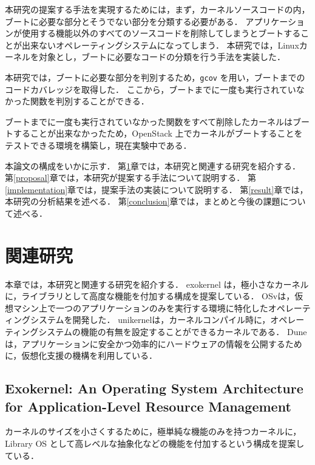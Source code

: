 \documentclass[graduation-thesis]{mlarticle}
\begin{document}
本研究の提案する手法を実現するためには，まず，カーネルソースコードの内，ブートに必要な部分とそうでない部分を分類する必要がある．
アプリケーションが使用する機能以外のすべてのソースコードを削除してしまうとブートすることが出来ないオペレーティングシステムになってしまう．
本研究では，Linuxカーネルを対象とし，ブートに必要なコードの分類を行う手法を実装した．

本研究では，ブートに必要な部分を判別するため，\texttt{gcov}\cite{gcov} を用い，ブートまでのコードカバレッジを取得した．
ここから，ブートまでに一度も実行されていなかった関数を判別することができる．

ブートまでに一度も実行されていなかった関数をすべて削除したカーネルはブートすることが出来なかったため，OpenStack\cite{openstack} 上でカーネルがブートすることをテストできる環境を構築し，現在実験中である．

本論文の構成をいかに示す．
第\ref{relative}章では，本研究と関連する研究を紹介する．
第\ref{proposal}章では，本研究が提案する手法について説明する．
第\ref{implementation}章では，提案手法の実装について説明する．
第\ref{result}章では，本研究の分析結果を述べる．
第\ref{conclusion}章では，まとめと今後の課題について述べる．

\clearpage
\section {関連研究}
\label{relative}

本章では，本研究と関連する研究を紹介する．
exokernel\cite{engler1995exokernel} は，極小さなカーネルに，ライブラリとして高度な機能を付加する構成を提案している．
OSv\cite{kivity2014osv}は，仮想マシン上で一つのアプリケーションのみを実行する環境に特化したオペレーティングシステムを開発した．
unikernel\cite{madhavapeddy2013unikernels}は，カーネルコンパイル時に，オペレーティングシステムの機能の有無を設定することができるカーネルである．
Dune\cite{belay2012dune}は，アプリケーションに安全かつ効率的にハードウェアの情報を公開するために，仮想化支援の機構を利用している．

\subsection {Exokernel: An Operating System Architecture for Application-Level Resource Management}
\label{relative:exokernel}
カーネルのサイズを小さくするために，極単純な機能のみを持つカーネルに，Library OS として高レベルな抽象化などの機能を付加するという構成を提案している．
\end{document}
